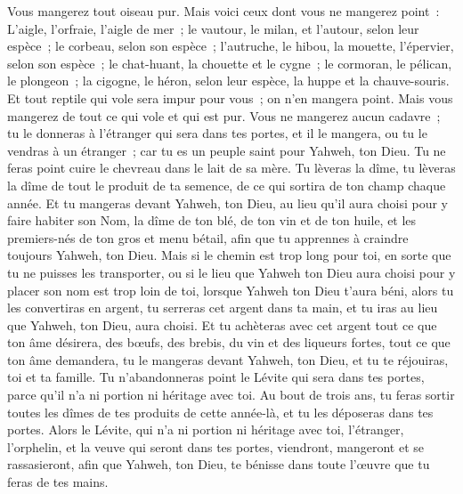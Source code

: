 \begin{multicols}{2}
Vous mangerez tout oiseau pur.
Mais voici ceux dont vous ne mangerez point~: L'aigle, l'orfraie, l'aigle de mer~;
le vautour, le milan, et l'autour, selon leur espèce~;
le corbeau, selon son espèce~;
l'autruche, le hibou, la mouette, l'épervier, selon son espèce~;
le chat-huant, la chouette et le cygne~;
le cormoran, le pélican, le plongeon~;
la cigogne, le héron, selon leur espèce, la huppe et la chauve-souris.
Et tout reptile qui vole sera impur pour vous~; on n'en mangera point.
Mais vous mangerez de tout ce qui vole et qui est pur.
Vous ne mangerez aucun cadavre~; tu le donneras à l'étranger qui sera dans tes portes, et il le mangera, ou tu le vendras à un étranger~; car tu es un peuple saint pour Yahweh, ton Dieu. Tu ne feras point cuire le chevreau dans le lait de sa mère.
Tu lèveras la dîme, tu lèveras la dîme de tout le produit de ta semence, de ce qui sortira de ton champ chaque année.
Et tu mangeras devant Yahweh, ton Dieu, au lieu qu'il aura choisi pour y faire habiter son Nom, la dîme de ton blé, de ton vin et de ton huile, et les premiers-nés de ton gros et menu bétail, afin que tu apprennes à craindre toujours Yahweh, ton Dieu.
Mais si le chemin est trop long pour toi, en sorte que tu ne puisses les transporter, ou si le lieu que Yahweh ton Dieu aura choisi pour y placer son nom est trop loin de toi, lorsque Yahweh ton Dieu t’aura béni,
alors tu les convertiras en argent, tu serreras cet argent dans ta main, et tu iras au lieu que Yahweh, ton Dieu, aura choisi.
Et tu achèteras avec cet argent tout ce que ton âme désirera, des bœufs, des brebis, du vin et des liqueurs fortes, tout ce que ton âme demandera, tu le mangeras devant Yahweh, ton Dieu, et tu te réjouiras, toi et ta famille.
Tu n'abandonneras point le Lévite qui sera dans tes portes, parce qu'il n'a ni portion ni héritage avec toi.
Au bout de trois ans, tu feras sortir toutes les dîmes de tes produits de cette année-là, et tu les déposeras dans tes portes.
Alors le Lévite, qui n'a ni portion ni héritage avec toi, l'étranger, l'orphelin, et la veuve qui seront dans tes portes, viendront, mangeront et se rassasieront, afin que Yahweh, ton Dieu, te bénisse dans toute l'œuvre que tu feras de tes mains.

\end{multicols}
